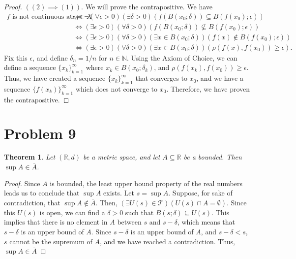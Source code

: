 \documentclass[10pt,a4paper]{article}
\theoremstyle{theorem}
\newtheorem{theorem}{Theorem}
\theoremstyle{definition}
\newcommand{\Tau}{\mathcal{T}}
\begin{document}
\begin{proof}
$((2) \implies (1))$. We will prove the contrapositive. We have 
\begin{align*}
f \text{ is not continuous at } x_0 \in X &\iff \neg(\forall \epsilon > 0)(\exists \delta >0)(f(B(x_0;\delta)) \subseteq B(f(x_0); \epsilon))\\
&\iff (\exists \epsilon > 0)(\forall \delta >0)(f(B(x_0;\delta)) \not \subseteq B(f(x_0); \epsilon))\\
&\iff (\exists \epsilon > 0)(\forall \delta >0)(\exists x \in B(x_0;\delta))(f(x) \not \in B(f(x_0); \epsilon))\\
&\iff (\exists \epsilon > 0)(\forall \delta >0)(\exists x \in B(x_0;\delta))(\rho(f(x), f(x_0)) \geq \epsilon ).
\end{align*}
Fix this $\epsilon$, and define $\delta_n = 1/n$ for $n \in \mathbb{N}$. Using the Axiom of Choice, we can define a sequence $\{x_k\}_{k=1}^\infty$ where $x_k \in B(x_0; \delta_k)$, and $\rho(f(x_k), f(x_0)) \geq \epsilon$. Thus, we have created a sequence $\{x_k\}_{k=1}^\infty$ that converges to $x_0$, and we have a sequence $\{f(x_k)\}_{k=1}^\infty$ which does not converge to $x_0$. Therefore, we have proven the contrapositive.
\end{proof}

\section*{Problem 9}
\begin{theorem}
Let $(\mathbb{R}, d)$ be a metric space, and let $A \subseteq \mathbb{R}$ be a bounded. Then $\sup A \in \bar{A}$.
\end{theorem}

\begin{proof}
Since $A$ is bounded, the least upper bound property of the real numbers leads us to conclude that $\sup A$ exists. Let $s = \sup A$. Suppose, for sake of contradiction,  that $\sup A \not \in \bar{A}$.  Then, $(\exists U(s) \in \Tau)(U(s) \cap A = \emptyset)$. Since this $U(s)$ is open, we can find a $\delta > 0$ such that $B(s; \delta) \subseteq U(s)$.  This implies that there is no element in $A$ between $s$ and $s - \delta$, which means that $s - \delta$ is an upper bound of $A$. Since $s - \delta$ is an upper bound of $A$, and $s - \delta < s$, $s$ cannot be the supremum of $A$, and we have reached a contradiction. Thus, $\sup A \in \bar{A}$
\end{proof}
\end{document}
